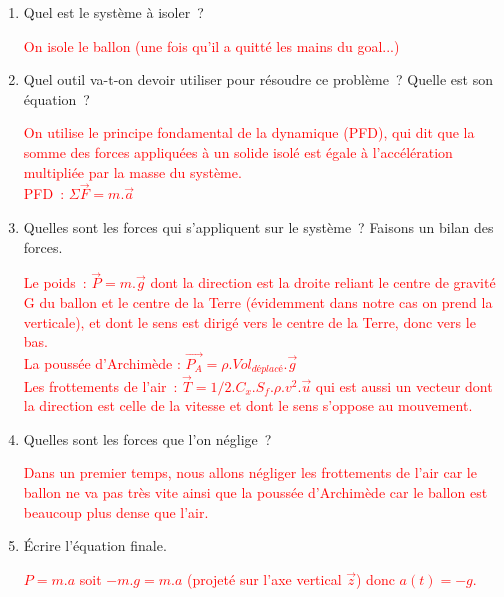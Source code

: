 \documentclass[french,a4paper,10pt]{article}
\begin{document}
\begin{enumerate}
    \item Quel est le système à isoler ?\\
\begin{reponse}
    \textcolor{red}{On isole le ballon (une fois qu’il a quitté les mains du goal...)}
\end{reponse}

    \item Quel outil va-t-on devoir utiliser pour résoudre ce problème ? Quelle est son équation ? \\
\begin{reponse}
\textcolor{red}{On utilise le principe fondamental de la dynamique (PFD), qui dit que la somme des forces appliquées à un solide isolé est égale à l’accélération multipliée par la masse du système. \\
PFD : $\Sigma \vec{F} = m . \vec{a}$}
\end{reponse}

    \item Quelles sont les forces qui s’appliquent sur le système ? Faisons un bilan des forces. \\
\begin{reponse}
\textcolor{red}{Le poids : $\vec{P} = m . \vec{g}$ dont la direction est la droite reliant le centre de gravité G du ballon et le centre de la Terre (évidemment dans notre cas on prend la verticale), et dont le sens est dirigé vers le centre de la Terre, donc vers le bas. \\
La poussée d'Archimède : $\vec{P_A} = \rho . Vol_{déplacé} . \vec{g}$\\
Les frottements de l’air : $\vec{T} = 1/2 . C_x . S_f . \rho . v^2 . \vec{u}$ qui est aussi un vecteur dont la direction est celle de la vitesse et dont le sens s'oppose au mouvement.}
\end{reponse}

    \item Quelles sont les forces que l’on néglige ? \\
\begin{reponse}
\textcolor{red}{Dans un premier temps, nous allons négliger les frottements de l’air car le ballon ne va pas très vite ainsi que la poussée d'Archimède car le ballon est beaucoup plus dense que l'air.}
\end{reponse}

    \item Écrire l’équation finale. \\
\begin{reponse}
\textcolor{red}{$P = m . a$ soit $-m . g = m . a$ (projeté sur l’axe vertical $\vec{z}$) donc $a(t) = -g$.}
\end{reponse}
\end{enumerate}
\end{document}
